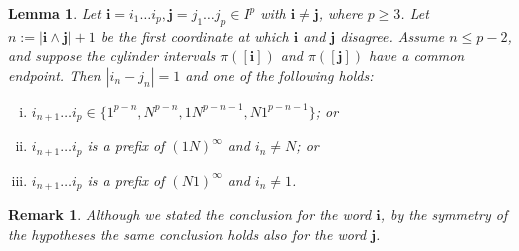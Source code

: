 \documentclass[11pt]{amsart}
\newcommand{\1}{1}
\newtheorem{lemma}[theorem]{Lemma}
\newtheorem{remark}[theorem]{Remark}
\begin{document}
\begin{lemma} \label{lem:adjacency-possibilities}
Let $\mathbf{i}=i_1\dots i_p, \mathbf{j}=j_1\dots j_p\in I^p$ with $\mathbf{i}\neq\mathbf{j}$, where $p\geq 3$. Let $n:=|\mathbf{i}\wedge\mathbf{j}|+1$ be the first coordinate at which $\mathbf{i}$ and $\mathbf{j}$ disagree. Assume $n\leq p-2$, and suppose the cylinder intervals $\pi([\mathbf{i}])$ and $\pi([\mathbf{j}])$ have a common endpoint. Then $|i_n-j_n|=1$ and one of the following holds:
\begin{enumerate}[(i)]
\item $i_{n+1}\dots i_p\in\big\{1^{p-n},N^{p-n},1N^{p-n-1},N1^{p-n-1}\big\}$; or
\item $i_{n+1}\dots i_p$ is a prefix of $(1N)^\infty$ and $i_n\neq N$; or
\item $i_{n+1}\dots i_p$ is a prefix of $(N1)^\infty$ and $i_n\neq 1$.
\end{enumerate}
\end{lemma}

{
\begin{remark}
{\rm 
Although we stated the conclusion for the word $\mathbf{i}$, by the symmetry of the hypotheses the same conclusion holds also for the word $\mathbf{j}$.
}
\end{remark}
}
\end{document}
